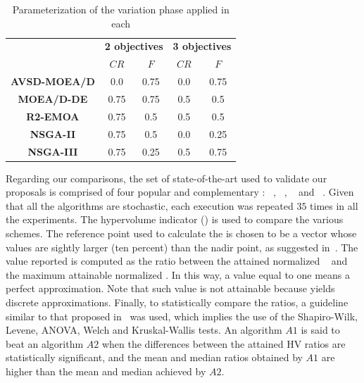 \begin{table}[t]
\centering
\caption{Parameterization of the variation phase applied in each \MOEA{}}
\label{tab:tunning}
\begin{scriptsize}
\begin{tabular}{c|c|c|c|c}
\hline
\multirow{2}{*}{} &\multicolumn{2}{c|}{ \textbf{2 objectives} }& \multicolumn{2}{c}{\textbf{3 objectives} }\\ \cline{2-5} 
 & $CR$ & $F$ & $CR$ & $F$ \\ \hline
\textbf{AVSD-MOEA/D} & 0.0 & 0.75 & 0.0 & 0.75 \\ \hline
\textbf{MOEA/D-DE} & 0.75 & 0.75 & 0.5 & 0.5 \\ \hline
\textbf{R2-EMOA} & 0.75 & 0.5 & 0.5 & 0.5 \\ \hline
\textbf{NSGA-II} & 0.75 & 0.5 & 0.0 & 0.25 \\ \hline
\textbf{NSGA-III} & 0.75 & 0.25 & 0.5 & 0.75 \\ \hline
\end{tabular}%
\end{scriptsize}
\end{table}

Regarding our comparisons, the set of state-of-the-art \MOEAS{} used to validate our proposals is comprised of four 
popular and complementary \MOEAS{}: \NSGAII{}~\cite{deb2002fast}, \MOEADDE{}~\cite{zhang2009performance}, \RMOEA{}~\cite{trautmann2013r2} 
and \NSGAIII{}~\cite{deb2013evolutionary}.
%
%
%
Given that all the algorithms are stochastic, each execution was repeated $35$ times in all the experiments.
%
The hypervolume indicator (\HV{}) is used to compare the various schemes.
%
The reference point used to calculate the \HV{} is chosen to be a vector whose values are sightly larger (ten percent) 
than the nadir point, as suggested in~\cite{ishibuchi2017reference}.
%
The value reported is computed as the ratio between the attained normalized \HV{}~\cite{li2014evolutionary} 
and the maximum attainable normalized \HV{}.
%
In this way, a value equal to one means a perfect approximation.
%
Note that such value is not attainable because \MOEAS{} yields discrete approximations.
%
Finally, to statistically compare the \HV{} ratios, a guideline similar to that proposed in~\cite{durillo2010study} was used, 
which implies the use of the Shapiro-Wilk, Levene, ANOVA, Welch and Kruskal-Wallis tests.
%
An algorithm $A1$ is said to beat an algorithm $A2$ when the differences between the attained HV ratios are statistically significant, 
and the mean and median \HV{} ratios obtained by $A1$ are higher than the mean and median achieved by $A2$.

